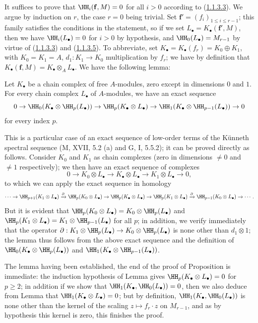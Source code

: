 It suffices to prove that $\HH_i(\mathbf{f},M)=0$ for all $i>0$ according to (\hyperref[III.1.1.3.3]{1.1.3.3}).
We argue by induction on $r$, the case $r=0$ being trivial.
Set $\mathbf{f}'=(f_i)_{1\leq i\leq r-1}$; this family satisfies the conditions in the statement, so if we set $L_\bullet=K_\bullet(\mathbf{f}',M)$, then we have $\HH_i(L_\bullet)=0$ for $i>0$ by hypothesis, and $\HH_0(L_\bullet)=M_{r-1}$ by virtue of (\hyperref[III.1.1.3.3]{1.1.3.3}) and (\hyperref[III.1.1.3.5]{1.1.3.5}).
To abbreviate, set $K_\bullet=K_\bullet(f_r)=K_0\oplus K_1$, with $K_0=K_1=A$, $d_1:K_1\to K_0$ multiplication by $f_r$; we have by definition  that $K_\bullet(\mathbf{f},M)=K_\bullet\otimes_A L_\bullet$.
We have the following lemma:

\begin{lemma}[1.1.4.1]
\label{III.1.1.4.1}
Let $K_\bullet$ be a chain complex of free $A$-modules, zero except in dimensions $0$ and $1$.
For every chain complex $L_\bullet$ of $A$-modules, we have an exact sequence
\[
  0\to\HH_0(K_\bullet\otimes\HH_p(L_\bullet))\to\HH_p(K_\bullet\otimes L_\bullet)\to\HH_1(K_\bullet\otimes\HH_{p-1}(L_\bullet))\to 0
\]
for every index $p$.
\end{lemma}

This is a particular case of an exact sequence of low-order terms of the K\"unneth spectral sequence (M, XVII, 5.2 (a) and G, I, 5.5.2); it can be proved directly as follows.
Consider $K_0$ and $K_1$ as chain complexes (zero in dimensions $\neq 0$ and $\neq 1$ respectively); we then have an exact sequence of complexes
\[
  0\to K_0\otimes L_\bullet\to K_\bullet\otimes L_\bullet\to K_1\otimes L_\bullet\to 0,
\]
to which we can apply the exact sequence in homology
\[
  \cdots\to\HH_{p+1}(K_1\otimes L_\bullet)\xrightarrow{\partial}\HH_p(K_0\otimes L_\bullet)\to\HH_p(K_\bullet\otimes L_\bullet)\to\HH_p(K_1\otimes L_\bullet)\xrightarrow{\partial}\HH_{p-1}(K_0\otimes L_\bullet)\to\cdots.
\]
But it is evident that $\HH_p(K_0\otimes L_\bullet)=K_0\otimes\HH_p(L_\bullet)$ and $\HH_p(K_1\otimes L_\bullet)=K_1\otimes\HH_{p-1}(L_\bullet)$ for all $p$; in addition, we verify immediately that the operator $\partial:K_1\otimes\HH_p(L_\bullet)\to K_0\otimes\HH_p(L_\bullet)$ is none other than $d_1\otimes 1$; the lemma thus follows from the above exact sequence and the definition of $\HH_0(K_\bullet\otimes\HH_p(L_\bullet))$ and $\HH_1(K_\bullet\otimes\HH_{p-1}(L_\bullet))$.

The lemma having been established, the end of the proof of Proposition  is immediate: the induction hypothesis of Lemma  gives $\HH_p(K_\bullet\otimes L_\bullet)=0$ for $p\geq 2$; in addition if we show that $\HH_1(K_\bullet,\HH_0(L_\bullet))=0$, then we also deduce from Lemma  that $\HH_1(K_\bullet\otimes L_\bullet)=0$; but by definition, $\HH_1(K_\bullet,\HH_0(L_\bullet))$ is none other than the kernel of the scaling $z\mapsto f_r\cdot z$ on $M_{r-1}$, and as by hypothesis this kernel is zero, this finishes the proof.

